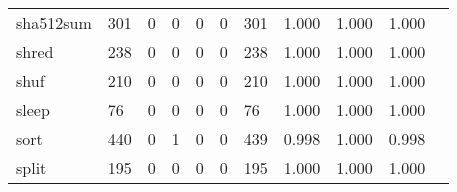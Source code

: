 \begin{longtable}{lp{1.2cm}p{1.2cm}p{1.2cm}p{1.2cm}p{1.2cm}p{1.2cm}p{1.2cm}p{1.2cm}p{1.2cm}p{1.2cm}}
sha512sum &                                   301 &                                                  0 &                                                  0 &                                                  0 &                                                  0 &                                                301 &                                         1.000 &                                              1.000 &                                              1.000 \\
shred     &                                   238 &                                                  0 &                                                  0 &                                                  0 &                                                  0 &                                                238 &                                         1.000 &                                              1.000 &                                              1.000 \\
shuf      &                                   210 &                                                  0 &                                                  0 &                                                  0 &                                                  0 &                                                210 &                                         1.000 &                                              1.000 &                                              1.000 \\
sleep     &                                    76 &                                                  0 &                                                  0 &                                                  0 &                                                  0 &                                                 76 &                                         1.000 &                                              1.000 &                                              1.000 \\
sort      &                                   440 &                                                  0 &                                                  1 &                                                  0 &                                                  0 &                                                439 &                                         0.998 &                                              1.000 &                                              0.998 \\
split     &                                   195 &                                                  0 &                                                  0 &                                                  0 &                                                  0 &                                                195 &                                         1.000 &                                              1.000 &                                              1.000 \\

\end{longtable}
